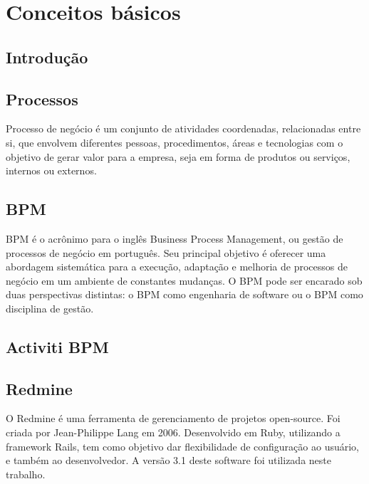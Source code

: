 \chapter{Conceitos básicos}\label{chp:LABEL_CHP_2}

\section{Introdução}\label{sec:LABEL_CHP_2_SEC_A}

\section{Processos}\label{sec:LABEL_CHP_2_SEC_B}
Processo de negócio é um conjunto de atividades coordenadas, relacionadas entre si, que envolvem diferentes pessoas, procedimentos, áreas e tecnologias com o objetivo de gerar valor para a empresa, seja em forma de produtos ou serviços, internos ou externos.

\section{BPM}\label{sec:LABEL_CHP_2_SEC_C}
BPM é o acrônimo para o inglês Business Process Management, ou gestão de processos de negócio em português. Seu principal objetivo é oferecer uma abordagem sistemática para a execução, adaptação e melhoria de processos de negócio em um ambiente de constantes mudanças. O BPM pode ser encarado sob duas perspectivas distintas: o BPM como engenharia de software ou o BPM como disciplina de gestão.

\section{Activiti BPM}\label{sec:LABEL_CHP_2_SEC_D}


\section{Redmine}\label{sec:LABEL_CHP_2_SEC_E}
O Redmine é uma ferramenta de gerenciamento de projetos open-source. Foi criada por Jean-Philippe Lang em 2006. Desenvolvido em Ruby, utilizando a framework Rails, tem como objetivo dar flexibilidade de configuração ao usuário, e também ao desenvolvedor. A versão 3.1 deste software foi utilizada neste trabalho.


